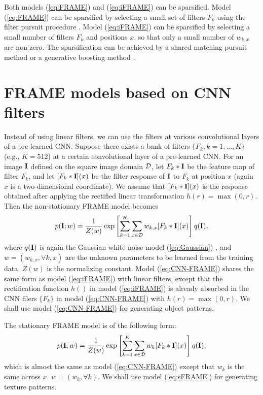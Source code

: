 \documentclass[letterpaper]{article}
\def\I{{\bf I}}
\begin{document}
Both models (\ref{eq:FRAME}) and (\ref{eq:iFRAME}) can be sparsified. Model (\ref{eq:FRAME}) can be sparsified by selecting a small set of filters $F_k$ using the filter pursuit procedure \citep{zhu1997minimax}.  Model (\ref{eq:iFRAME}) can be sparsified by selecting a small number of filters $F_k$ and positions $x$, so that only a small number of $w_{k, x}$ are non-zero. The sparsification can be achieved by a shared matching pursuit method \citep{xie2014learning} or a generative boosting method \citep{xie2015boosting}. 

\section{FRAME models based on CNN filters}

Instead of using linear filters, we can use the filters at various convolutional layers of a pre-learned CNN. Suppose there exists a bank of filters $\{F_k, k = 1, ..., K\}$ (e.g., $K = 512$) at a certain convolutional layer of a pre-learned CNN. For an image $\I$ defined on the square image domain ${\cal D}$, let $F_k*\I$ be the feature map of filter $F_k$, and let $[F_k*\I](x)$ be the filter response of $\I$ to $F_k$ at position $x$ (again $x$ is a two-dimensional coordinate).  We assume that $[F_k*\I](x)$ is the response obtained after applying the rectified linear transformation $h(r) = \max(0, r)$. Then the non-stationary FRAME model becomes
\begin{eqnarray}
   p(\I; w) = \frac{1}{Z(w)} \exp \left[\sum_{k=1}^{K} \sum_{x \in {\cal D}} w_{k, x} [F_k*\I](x)\right] q(\I), 
   \label{eq:CNN-FRAME}
\end{eqnarray}
where $q(\I)$ is again the Gaussian white noise model (\ref{eq:Gaussian}) , and $w  = (w_{k, x}, \forall k, x)$ are the unknown parameters to be learned from the training data.  $Z(w)$ is the normalizing constant. Model (\ref{eq:CNN-FRAME}) shares the same form as model (\ref{eq:iFRAME}) with linear filters, except that the rectification function $h()$ in model (\ref{eq:iFRAME}) is already absorbed in the CNN filers $\{F_k\}$ in model (\ref{eq:CNN-FRAME}) with $h(r) = \max(0, r)$.  We shall use  model (\ref{eq:CNN-FRAME}) for generating object patterns. 

The stationary  FRAME model is of the following form:
\begin{eqnarray}
   p(\I; w) = \frac{1}{Z(w)} \exp \left[\sum_{k=1}^{K} \sum_{x \in {\cal D}} w_{k} [F_k*\I](x)\right] q(\I), 
   \label{eq:sFRAME}
\end{eqnarray}
which is almost the same as model (\ref{eq:CNN-FRAME}) except that  $w_k$ is the same across $x$. $w = (w_k, \forall k)$. We shall use model (\ref{eq:sFRAME}) for generating texture patterns. 
\end{document}
